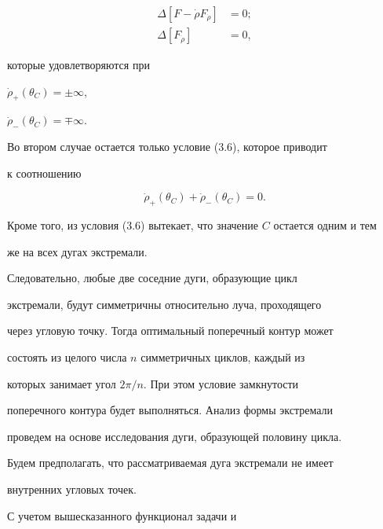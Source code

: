 \begin{equation}


\begin{split}


\Delta [ F - \Dot{\rho} F_{\Dot{\rho}} ] &= 0;\\


\Delta [ F_{\Dot{\rho}} ] &= 0,


\end{split}


\end{equation}


которые удовлетворяются при


$\Dot{\rho}_{+} (\theta_C) = \pm \infty$,


$\Dot{\rho}_{-} (\theta_C) = \mp \infty$.





Во втором случае остается только условие (3.6), которое приводит


к соотношению


$$


\Dot{\rho}_{+} (\theta_C) + \Dot{\rho}_{-} (\theta_C) = 0.


$$


Кроме того, из условия (3.6) вытекает, что значение $C$ остается одним и тем


же на всех дугах экстремали.





Следовательно, любые две соседние дуги, образующие цикл


экстремали, будут симметричны относительно луча, проходящего


через угловую точку. Тогда оптимальный поперечный контур может


состоять из целого числа $n$ симметричных циклов, каждый из


которых занимает угол $2 \pi / n$. При этом условие замкнутости


поперечного контура будет выполняться. Анализ формы экстремали


проведем на основе исследования дуги, образующей половину цикла.


Будем предполагать, что рассматриваемая дуга экстремали не имеет


внутренних угловых точек.





С учетом вышесказанного функционал задачи и


